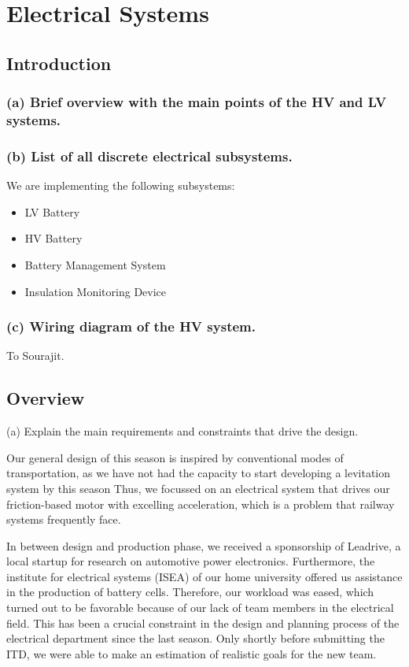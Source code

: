 \chapter{Electrical Systems}

\section{Introduction}
\subsection{(a) Brief overview with the main points of the HV and LV systems.}
\subsection{(b) List of all discrete electrical subsystems.}
We are implementing the following subsystems: 
\begin{itemize}
    \item LV Battery
    \item HV Battery
    \item Battery Management System
    \item Insulation Monitoring Device
\end{itemize}

\subsection{(c) Wiring diagram of the HV system.}
To Sourajit.


\section{Overview}
(a) Explain the main requirements and constraints that drive the design. \\
\par Our general design of this season is inspired by conventional modes of transportation,
as we have not had the capacity to start developing a levitation system by this season
Thus, we focussed on an electrical system that drives our friction-based motor with
excelling acceleration, which is a problem that railway systems frequently face.

\par In between design and production phase, we received a sponsorship of Leadrive,
a local startup for research on automotive power electronics.
Furthermore, the institute for electrical systems (ISEA) of our home university offered us assistance in the production of battery cells.
Therefore, our workload was eased, which turned out to be favorable
because of our lack of team members in the electrical field. This has been a crucial
constraint in the design and planning process of the electrical department
since the last season. Only shortly before submitting the ITD, we were able to make an estimation of
realistic goals for the new team.

